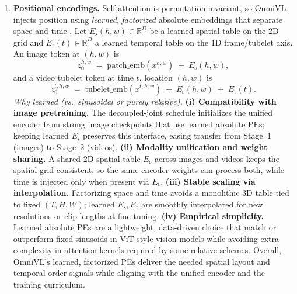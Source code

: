 \begin{enrichment}
\begin{enrichment}
\begin{enumerate}
            \item \textbf{Positional encodings.} Self-attention is permutation invariant, so OmniVL injects position using \emph{learned}, \emph{factorized} absolute embeddings that separate space and time \cite{wang2022_omnivl}. Let \(E_{\mathrm{s}}(h,w)\in\mathbb{R}^{D}\) be a learned spatial table on the 2D grid and \(E_{\mathrm{t}}(t)\in\mathbb{R}^{D}\) a learned temporal table on the 1D frame/tubelet axis. An image token at \((h,w)\) is
            \[
            z_{0}^{h,w} \;=\; \mathrm{patch\_emb}\!\left(x^{h,w}\right) \;+\; E_{\mathrm{s}}(h,w),
            \]
            and a video tubelet token at time \(t\), location \((h,w)\) is
            \[
            z_{0}^{t,h,w} \;=\; \mathrm{tubelet\_emb}\!\left(x^{t,h,w}\right) \;+\; E_{\mathrm{s}}(h,w) \;+\; E_{\mathrm{t}}(t).
            \]
            \emph{Why learned (vs.\ sinusoidal or purely relative).} \textbf{(i) Compatibility with image pretraining.} The decoupled-joint schedule initializes the unified encoder from strong image checkpoints that use learned absolute PEs; keeping learned \(E_{\mathrm{s}}\) preserves this interface, easing transfer from Stage~1 (images) to Stage~2 (videos). \textbf{(ii) Modality unification and weight sharing.} A shared 2D spatial table \(E_{\mathrm{s}}\) across images and videos keeps the spatial grid consistent, so the same encoder weights can process both, while time is injected only when present via \(E_{\mathrm{t}}\). \textbf{(iii) Stable scaling via interpolation.} Factorizing space and time avoids a monolithic 3D table tied to fixed \((T,H,W)\); learned \(E_{\mathrm{s}},E_{\mathrm{t}}\) are smoothly interpolated for new resolutions or clip lengths at fine-tuning. \textbf{(iv) Empirical simplicity.} Learned absolute PEs are a lightweight, data-driven choice that match or outperform fixed sinusoids in ViT-style vision models while avoiding extra complexity in attention kernels required by some relative schemes. Overall, OmniVL’s learned, factorized PEs deliver the needed spatial layout and temporal order signals while aligning with the unified encoder and the training curriculum.
            

\end{enumerate}
\end{enrichment}
\end{enrichment}
